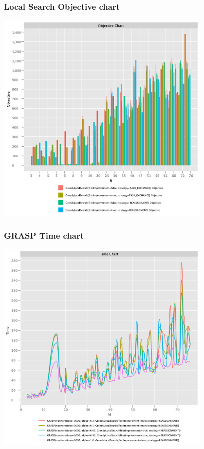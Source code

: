 \documentclass{beamer}
\begin{document}
\begin{frame}
\frametitle{Local Search Objective chart}
\includegraphics[width=0.8\textwidth]{./documentation/assets/localSearchParams.objectiveChart.pdf}
\end{frame}

\begin{frame}
\frametitle{GRASP Time chart}
\includegraphics[width=0.8\textwidth]{./documentation/assets/GRASPParams.timeChart.pdf}
\end{frame}
\end{document}
